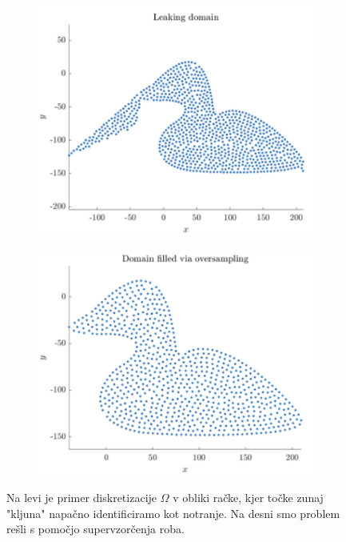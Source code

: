 \documentclass{article}
\begin{document}
\begin{figure}[H]
\centering
\begin{subfigure}{.48\textwidth}
\includegraphics[width=\linewidth]{Slike/supersampling1.png}
\end{subfigure}
\begin{subfigure}{.48\textwidth}
\includegraphics[width=\linewidth]{Slike/supersampling2.png}
\end{subfigure}
\caption{Na levi je primer diskretizacije $\Omega$ v obliki račke, kjer točke zunaj "kljuna" napačno identificiramo kot notranje. Na desni smo problem rešli s pomočjo supervzorčenja roba.}
\label{fig:supersampling}
\end{figure}
\end{document}

